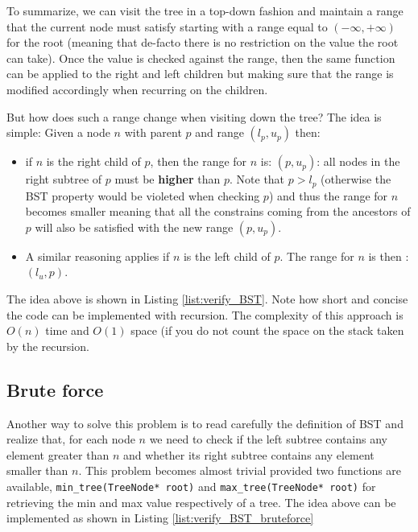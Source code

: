 To summarize, we can visit the tree in a top-down fashion and maintain a range that the current node must satisfy starting with a range equal to $(-\infty, +\infty)$ for the root (meaning that de-facto there is no restriction on the value the root can take). Once the value is checked against the range, then the same function can be applied to the right and left children but making sure that the range is modified accordingly when recurring on the children. 

But how does such a range change when visiting down the tree? The idea is simple: Given a node $n$ with parent $p$ and range \( (l_p, u_p) \) then:
\begin{itemize}
	\item if $n$ is the right child of $p$, then the range for $n$ is: $(p, u_p)$: all nodes in the right subtree of $p$ must be \textbf{higher} than $p$. Note that $p > l_p$ (otherwise the BST property would be violeted when checking $p$) and thus the range for $n$ becomes smaller meaning that all the constrains coming from the ancestors of $p$ will also be satisfied with the new range $(p, u_p)$.
	\item A similar reasoning applies if $n$ is the left child of $p$. The range for $n$ is then : $(l_u,p)$.
\end{itemize}

The idea above is shown in Listing \ref{list:verify_BST}. Note how short and concise the code can be implemented with recursion.  The complexity of this approach is $O(n)$ time and $O(1)$ space (if you do not count the space on the stack taken by the recursion.



\subsection{Brute force}
Another way to solve this problem is to read carefully the definition of BST and realize that, for each node $n$ we need to check if the left subtree contains any element greater than $n$ and whether its right subtree contains any element smaller than $n$. This problem becomes almost trivial provided two functions are available, \lstinline[columns=fixed]{min_tree(TreeNode* root)} and \lstinline[columns=fixed]{max_tree(TreeNode* root)} for retrieving the min and max value respectively of a tree. The idea above can be implemented as shown in Listing \ref{list:verify_BST_bruteforce}

